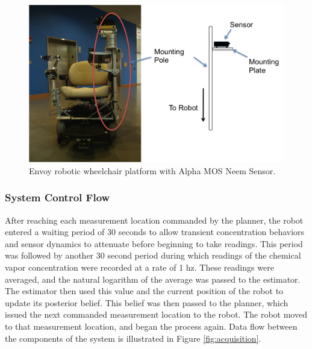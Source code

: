 \documentclass[submit]{aiaa-pretty-modified}
\begin{document}
\begin{figure}
\begin{center}
\includegraphics[width=5in]{img/wheelchair.pdf}
\caption{Envoy robotic wheelchair platform with Alpha MOS Neem Sensor.}
\label{fig:wheelchair}
\end{center}
\end{figure}

\FloatBarrier

\label{sec:mount}

\subsubsection{System Control Flow}

After reaching each measurement location commanded by the planner,
the robot entered a waiting period of 30 seconds to allow transient
concentration behaviors and sensor dynamics to attenuate before
beginning to take readings.  This period was followed by another 30
second period during which readings of the chemical vapor
concentration were recorded at a rate of 1 hz.  These readings were
averaged, and the natural logarithm of the average was passed to the
estimator.  The estimator then used this value and the current
position of the robot to update its posterior belief.  This belief was
then passed to the planner, which issued the next commanded
measurement location to the robot.  The robot moved to that measurement
location, and began the process again.  Data flow between the components of the system is illustrated in
Figure \ref{fig:acquisition}.
\end{document}
